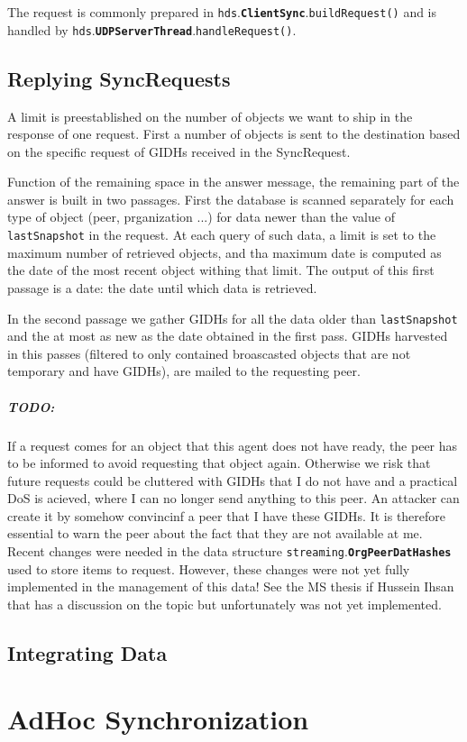\documentclass{book}
\newcommand{\pkg}[1]{{\tt #1}}
\newcommand{\cls}[1]{{\tt\bf #1}}
\newcommand{\mth}[1]{{\tt #1}}
\newcommand{\mmb}[1]{{\tt #1}}
\begin{document}
The request is commonly prepared in \pkg{hds}.\cls{ClientSync}.\mth{buildRequest()} and is handled by \pkg{hds}.\cls{UDPServerThread}.\mth{handleRequest()}.

\section{Replying SyncRequests}
A limit is preestablished on the number of objects we want to ship in the response of one request.
First a number of objects is sent to the destination based on the specific request of GIDHs received in the SyncRequest.

Function of the remaining space in the answer message, the remaining part of the answer is built in two passages. First the database is scanned separately for each type of object (peer, prganization ...) for data newer than the value of \mmb{lastSnapshot} in the request.
At each query of such data, a limit is set to the maximum number of retrieved objects, and tha maximum date is computed
as the date of the most recent object withing that limit. The output of this first passage is a date: the date until which data is retrieved.

In the second passage we gather GIDHs for all the data older than \mmb{lastSnapshot} and the at most as new as the date obtained in the 
first pass. GIDHs harvested in this passes (filtered to only contained broascasted objects that are not temporary and have GIDHs),
are mailed to the requesting peer.

\paragraph{TODO:} If a request comes for an object that this agent does not have ready, the peer has to be informed to avoid requesting that
object again. Otherwise we risk that future requests could be cluttered with GIDHs that I do not have and a practical DoS is acieved,
where I can no longer send anything to this peer. An attacker can create it by somehow convincinf a peer that I have these GIDHs.
It is therefore essential to warn the peer about the fact that they are not available at me. Recent changes were needed in the
data structure \pkg{streaming}.\cls{OrgPeerDatHashes} used to store items to request. However, these changes were not yet
fully implemented in the management of this data! See the MS thesis if Hussein Ihsan that has a discussion on the topic but unfortunately was not yet implemented.

\section{Integrating Data}

\chapter{AdHoc Synchronization}
\end{document}
